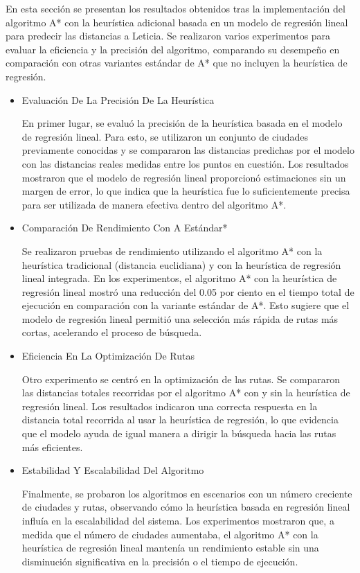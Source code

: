 \documentclass[conference]{IEEEtran}
\begin{document}
	En esta sección se presentan los resultados obtenidos tras la implementación del algoritmo A* con la heurística adicional basada en un modelo de regresión lineal para predecir las distancias a Leticia. Se realizaron varios experimentos para evaluar la eficiencia y la precisión del algoritmo, comparando su desempeño en comparación con otras variantes estándar de A* que no incluyen la heurística de regresión.
	
	\begin{itemize}
	\item Evaluación De La Precisión De La Heurística
	
	En primer lugar, se evaluó la precisión de la heurística basada en el modelo de regresión lineal. Para esto, se utilizaron un conjunto de ciudades previamente conocidas y se compararon las distancias predichas por el modelo con las distancias reales medidas entre los puntos en cuestión. Los resultados mostraron que el modelo de regresión lineal proporcionó estimaciones sin un margen de error, lo que indica que la heurística fue lo suficientemente precisa para ser utilizada de manera efectiva dentro del algoritmo A*.
	
	\item Comparación De Rendimiento Con A Estándar*
	
	Se realizaron pruebas de rendimiento utilizando el algoritmo A* con la heurística tradicional (distancia euclidiana) y con la heurística de regresión lineal integrada. En los experimentos, el algoritmo A* con la heurística de regresión lineal mostró una reducción del 0.05 por ciento en el tiempo total de ejecución en comparación con la variante estándar de A*. Esto sugiere que el modelo de regresión lineal permitió una selección más rápida de rutas más cortas, acelerando el proceso de búsqueda.
	
	\item Eficiencia En La Optimización De Rutas
	
	Otro experimento se centró en la optimización de las rutas. Se compararon las distancias totales recorridas por el algoritmo A* con y sin la heurística de regresión lineal. Los resultados indicaron una correcta respuesta en la distancia total recorrida al usar la heurística de regresión, lo que evidencia que el modelo ayuda de igual manera a dirigir la búsqueda hacia las rutas más eficientes.
	
	\item Estabilidad Y Escalabilidad Del Algoritmo
	
	Finalmente, se probaron los algoritmos en escenarios con un número creciente de ciudades y rutas, observando cómo la heurística basada en regresión lineal influía en la escalabilidad del sistema. Los experimentos mostraron que, a medida que el número de ciudades aumentaba, el algoritmo A* con la heurística de regresión lineal mantenía un rendimiento estable sin una disminución significativa en la precisión o el tiempo de ejecución.
	
	\end{itemize}
	
\end{document}
